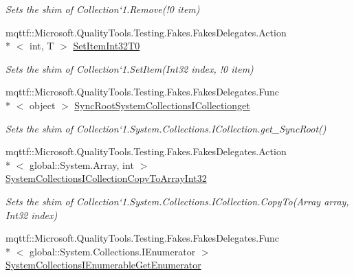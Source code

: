 \begin{DoxyCompactItemize}
\begin{DoxyCompactList}\small\item\em Sets the shim of Collection`1.Remove(!0 item)\end{DoxyCompactList}\item 
mqttf\-::\-Microsoft.\-Quality\-Tools.\-Testing.\-Fakes.\-Fakes\-Delegates.\-Action\\*
$<$ int, T $>$ \hyperlink{class_system_1_1_collections_1_1_object_model_1_1_fakes_1_1_shim_collection_3_01_t_01_4_af4da52513bcb54a7529117bc637757b2}{Set\-Item\-Int32\-T0}
\begin{DoxyCompactList}\small\item\em Sets the shim of Collection`1.Set\-Item(Int32 index, !0 item)\end{DoxyCompactList}\item 
mqttf\-::\-Microsoft.\-Quality\-Tools.\-Testing.\-Fakes.\-Fakes\-Delegates.\-Func\\*
$<$ object $>$ \hyperlink{class_system_1_1_collections_1_1_object_model_1_1_fakes_1_1_shim_collection_3_01_t_01_4_ae5cd435192eb40db138a0251f811c79a}{Sync\-Root\-System\-Collections\-I\-Collectionget}
\begin{DoxyCompactList}\small\item\em Sets the shim of Collection`1.System.\-Collections.\-I\-Collection.\-get\-\_\-\-Sync\-Root()\end{DoxyCompactList}\item 
mqttf\-::\-Microsoft.\-Quality\-Tools.\-Testing.\-Fakes.\-Fakes\-Delegates.\-Action\\*
$<$ global\-::\-System.\-Array, int $>$ \hyperlink{class_system_1_1_collections_1_1_object_model_1_1_fakes_1_1_shim_collection_3_01_t_01_4_afc2937e04e53e74e232e8844557251a1}{System\-Collections\-I\-Collection\-Copy\-To\-Array\-Int32}
\begin{DoxyCompactList}\small\item\em Sets the shim of Collection`1.System.\-Collections.\-I\-Collection.\-Copy\-To(\-Array array, Int32 index)\end{DoxyCompactList}\item 
mqttf\-::\-Microsoft.\-Quality\-Tools.\-Testing.\-Fakes.\-Fakes\-Delegates.\-Func\\*
$<$ global\-::\-System.\-Collections.\-I\-Enumerator $>$ \hyperlink{class_system_1_1_collections_1_1_object_model_1_1_fakes_1_1_shim_collection_3_01_t_01_4_ad682bf52272925b91fc6a2674caf3b9d}{System\-Collections\-I\-Enumerable\-Get\-Enumerator}

\end{DoxyCompactItemize}
